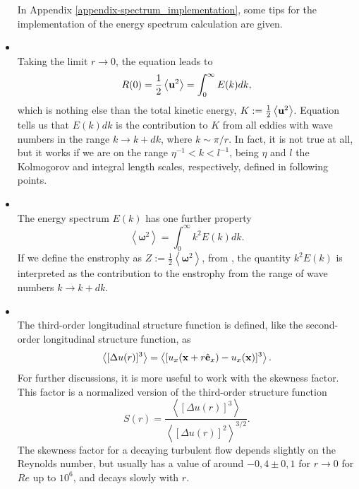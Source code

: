 \begin{itemize}
In Appendix \ref{appendix-spectrum_implementation}, some tips for the implementation of the energy spectrum calculation are given.
\item{}\\ Taking the limit $r\rightarrow 0$, the equation  leads to
\begin{equation}
\label{eq-total_kinetic_energy}
R(0)=\frac{1}{2}\left\langle{\bf u}^2\right\rangle=\int_0^\infty E(k)dk,
\end{equation}
which is nothing else than the total kinetic energy, $K:=\frac{1}{2}\left\langle{\bf u}^2\right\rangle$. Equation  tells us that $E(k)dk$ is the contribution to $K$ from all eddies with wave numbers in the range $k\rightarrow k+dk$, where $k\sim\pi/r$. In fact, it is not true at all, but it works if we are on the range $\eta^{-1}<k<l^{-1}$, being $\eta$ and $l$ the Kolmogorov and integral length scales, respectively, defined in following points.
\item{}\\ The energy spectrum $E(k)$ has one further property
\begin{equation}
\label{eq-enstrophy}
\left\langle\boldsymbol{\omega}^2\right\rangle=\int_0^\infty k^2E(k)dk.
\end{equation}
If we define the enstrophy as $Z:=\frac{1}{2}\left\langle\boldsymbol{\omega}^2\right\rangle$, from , the quantity $k^2E(k)$ is interpreted as the contribution to the enstrophy from the range of wave numbers $k\rightarrow k+dk$.
\item{}\\ The third-order longitudinal structure function is defined, like the second-order longitudinal structure function, as
\begin{equation*}
\label{eq-third_order_structure}
\left\langle[\Delta u(r)]^3\right\rangle=\left\langle[u_x({\bf x}+r\hat{{\bf e}}_x)-u_x({\bf x})]^3\right\rangle.
\end{equation*}
For further discussions, it is more useful to work with the skewness factor. This factor is a normalized version of the third-order structure function
\begin{equation}
\label{eq-skewness_factor}
S(r)=\frac{\left\langle[\Delta u(r)]^3\right\rangle}{\left\langle[\Delta u(r)]^2\right\rangle^{3/2}}.
\end{equation}
The skewness factor for a decaying turbulent flow depends slightly on the Reynolds number, but usually has a value of around $-0,4\pm0,1$ for $r\rightarrow0$ for $Re$ up to $10^6$, and decays slowly with $r$.

\end{itemize}
